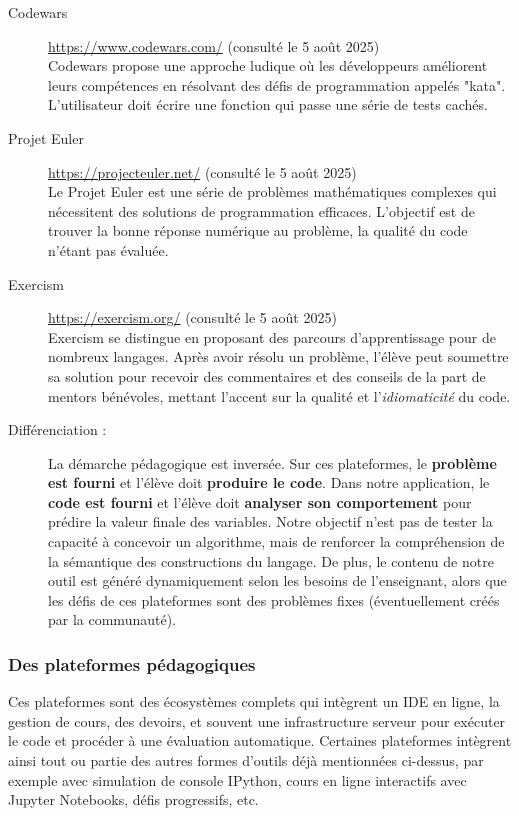 \documentclass[11pt,a4paper]{article}
\begin{document}
\begin{description}
    \item[Codewars] \url{https://www.codewars.com/} (consulté le 5 août 2025) \\
    Codewars propose une approche ludique où les développeurs améliorent leurs compétences en résolvant des défis de programmation appelés "kata". L'utilisateur doit écrire une fonction qui passe une série de tests cachés.

    \item[Projet Euler] \url{https://projecteuler.net/} (consulté le 5 août 2025) \\
    Le Projet Euler est une série de problèmes mathématiques complexes qui nécessitent des solutions de programmation efficaces. L'objectif est de trouver la bonne réponse numérique au problème, la qualité du code n'étant pas évaluée.

    \item[Exercism] \url{https://exercism.org/} (consulté le 5 août 2025) \\
    Exercism se distingue en proposant des parcours d'apprentissage pour de nombreux langages. Après avoir résolu un problème, l'élève peut soumettre sa solution pour recevoir des commentaires et des conseils de la part de mentors bénévoles, mettant l'accent sur la qualité et l'\textit{idiomaticité} du code.
    
    \item[Différenciation :] La démarche pédagogique est inversée. Sur ces plateformes, le \textbf{problème est fourni} et l'élève doit \textbf{produire le code}. Dans notre application, le \textbf{code est fourni} et l'élève doit \textbf{analyser son comportement} pour prédire la valeur finale des variables. Notre objectif n'est pas de tester la capacité à concevoir un algorithme, mais de renforcer la compréhension de la sémantique des constructions du langage. De plus, le contenu de notre outil est généré dynamiquement selon les besoins de l'enseignant, alors que les défis de ces plateformes sont des problèmes fixes (éventuellement créés par la communauté).
\end{description}

\subsubsection{Des plateformes pédagogiques}
Ces plateformes sont des écosystèmes complets qui intègrent un IDE en ligne, la gestion de cours, des devoirs, et souvent une infrastructure serveur pour exécuter le code et procéder à une évaluation automatique. Certaines plateformes intègrent ainsi tout ou partie des autres formes d'outils déjà mentionnées ci-dessus, par exemple avec simulation de console IPython, cours en ligne interactifs avec Jupyter Notebooks, défis progressifs, etc.
\end{document}
